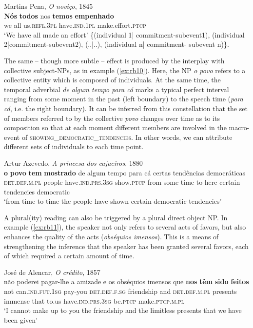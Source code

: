\documentclass[output=paper,colorlinks,citecolor=brown]{langscibook}
\begin{document}
\ea\label{ex:rb8}
Martins Pena, \textit{O noviço}, 1845\\
\gll \textbf{Nós} \textbf{todos} nos \textbf{temos} \textbf{empenhado}\\
we all us.\textsc{refl.3pl} have.\textsc{ind.1pl} make.effort.\textsc{ptcp}\\
\glt ‘We have all made an effort’
\ex\label{ex:rb9}
\{(individual 1| commitment-subevent1), (individual 	2|commitment-subevent2), (..|..), (individual n| commitment-	subevent n)\}.
\z

The same -- though more subtle -- effect is produced by the interplay with collective subject-NPs, as in example (\ref{ex:rb10}). Here, the NP \textit{o povo} refers to a collective entity which is composed of individuals. At the same time, the temporal adverbial \textit{de algum tempo para cá} marks a typical perfect interval ranging from some moment in the past (left boundary) to the speech time (\textit{para cá}, i.e. the right boundary). It can be inferred from this constellation that the set of members referred to by the collective \textit{povo} changes over time as to its composition so that at each moment different members are involved in the macro-event of \textsc{showing\_democratic\_tendencies}. In other words, we can attribute different sets of individuals to each time point.

\ea\label{ex:rb10}
Artur Azevedo, \textit{A princesa dos cajueiros}, 1880\\
\gll \textbf{o} \textbf{povo} \textbf{tem} \textbf{mostrado} de algum tempo para cá certas tendências democráticas\\
\textsc{det.def.m.pl} people have.\textsc{ind.prs.3sg} show.\textsc{ptcp} from some time to here certain tendencies democratic\\
\glt ‘from time to time the people have shown certain democratic tendencies’
\z

A plural(ity) reading can also be triggered by a plural direct object NP. In example (\ref{ex:rb11}), the speaker not only refers to several acts of favors, but also enhances the quality of the acts (\textit{obséquios imensos}). This is a means of strengthening the inference that the speaker has been granted several favors, each of which required a certain amount of time.

\ea\label{ex:rb11}
José de Alencar, \textit{O crédito}, 1857\\
\gll não poderei pagar-lhe a amizade e os obséquios imensos que \textbf{nos} \textbf{têm} \textbf{sido} \textbf{feitos}\\
not can.\textsc{ind.fut.1sg} pay-you \textsc{det.def.f.sg} friendship and \textsc{det.def.m.pl} presents immense that to.us have.\textsc{ind.prs.3sg} be.\textsc{ptcp} make.\textsc{ptcp.m.pl} \\
\glt ‘I cannot make up to you the friendship and the limitless presents that we have been given’
\z
\end{document}
